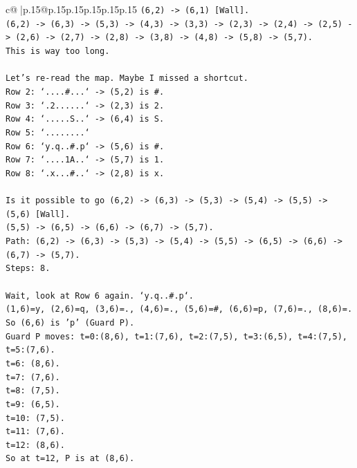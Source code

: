 \documentclass{article}
\begin{document}
{\begin{supertabular}{c@{$\;$}|p{.15\linewidth}@{}p{.15\linewidth}p{.15\linewidth}p{.15\linewidth}p{.15\linewidth}p{.15\linewidth}}
{{{\texttt{(6,2) {-}> (6,1) {[}Wall{]}.} \\
\texttt{(6,2) {-}> (6,3) {-}> (5,3) {-}> (4,3) {-}> (3,3) {-}> (2,3) {-}> (2,4) {-}> (2,5) {-}> (2,6) {-}> (2,7) {-}> (2,8) {-}> (3,8) {-}> (4,8) {-}> (5,8) {-}> (5,7).} \\
\texttt{This is way too long.} \\
\\ 
\texttt{Let's re{-}read the map. Maybe I missed a shortcut.} \\
\texttt{Row 2: `....\#...` {-}> (5,2) is \#.} \\
\texttt{Row 3: `.2......` {-}> (2,3) is 2.} \\
\texttt{Row 4: `.....S..` {-}> (6,4) is S.} \\
\texttt{Row 5: `........`} \\
\texttt{Row 6: `y.q..\#.p` {-}> (5,6) is \#.} \\
\texttt{Row 7: `....1A..` {-}> (5,7) is 1.} \\
\texttt{Row 8: `.x...\#..` {-}> (2,8) is x.} \\
\\ 
\texttt{Is it possible to go (6,2) {-}> (6,3) {-}> (5,3) {-}> (5,4) {-}> (5,5) {-}> (5,6) {[}Wall{]}.} \\
\texttt{(5,5) {-}> (6,5) {-}> (6,6) {-}> (6,7) {-}> (5,7).} \\
\texttt{Path: (6,2) {-}> (6,3) {-}> (5,3) {-}> (5,4) {-}> (5,5) {-}> (6,5) {-}> (6,6) {-}> (6,7) {-}> (5,7).} \\
\texttt{Steps: 8.} \\
\\ 
\texttt{Wait, look at Row 6 again. `y.q..\#.p`.} \\
\texttt{(1,6)=y, (2,6)=q, (3,6)=., (4,6)=., (5,6)=\#, (6,6)=p, (7,6)=., (8,6)=.} \\
\texttt{So (6,6) is 'p' (Guard P).} \\
\texttt{Guard P moves: t=0:(8,6), t=1:(7,6), t=2:(7,5), t=3:(6,5), t=4:(7,5), t=5:(7,6).} \\
\texttt{t=6: (8,6).} \\
\texttt{t=7: (7,6).} \\
\texttt{t=8: (7,5).} \\
\texttt{t=9: (6,5).} \\
\texttt{t=10: (7,5).} \\
\texttt{t=11: (7,6).} \\
\texttt{t=12: (8,6).} \\
\texttt{So at t=12, P is at (8,6).} \\
}}}
\end{supertabular}}
\end{document}
